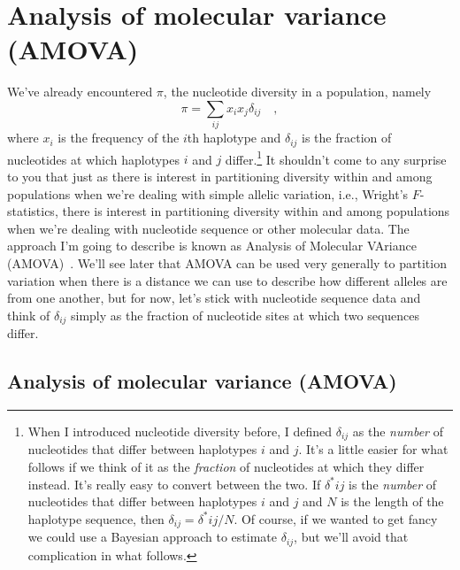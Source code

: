 \chapter{Analysis of molecular variance (AMOVA)}

We've already encountered $\pi$, the nucleotide diversity in a
population, namely
\[
\pi = \sum_{ij} x_ix_j \delta_{ij} \quad ,
\]
where $x_i$ is the frequency of the $i$th haplotype and $\delta_{ij}$
is the fraction of nucleotides at which haplotypes $i$ and $j$
differ.\footnote{When I introduced nucleotide diversity before, I
  defined $\delta_{ij}$ as the {\it number\/} of nucleotides that
  differ between haplotypes $i$ and $j$. It's a little easier for what
  follows if we think of it as the {\it fraction\/} of nucleotides at
  which they differ instead. It's really easy to convert between the
  two. If $\delta^*{ij}$ is the {\it number\/} of nucleotides that
  differ between haplotypes $i$ and $j$ and $N$ is the length of the
  haplotype sequence, then $\delta_{ij} = \delta^*{ij}/N$. Of course,
  if we wanted to get fancy we could use a Bayesian approach to
  estimate $\delta_{ij}$, but we'll avoid that complication in what
  follows.} It shouldn't come to any surprise to you that just as
there is interest in partitioning diversity within and among
populations when we're dealing with simple allelic variation, i.e.,
Wright's $F$-statistics, there is interest in partitioning diversity
within and among populations when we're dealing with nucleotide
sequence or other molecular data. The approach I'm going to describe
is known as Analysis of Molecular VAriance
(AMOVA)~\cite{Excoffier-etal92}. We'll see later that AMOVA can be
used very generally to partition variation when there is a distance we
can use to describe how different alleles are from one another, but
for now, let's stick with nucleotide sequence data and think of
$\delta_{ij}$ simply as the fraction of nucleotide sites at which two
sequences differ.

\section*{Analysis of molecular variance
  (AMOVA)}

